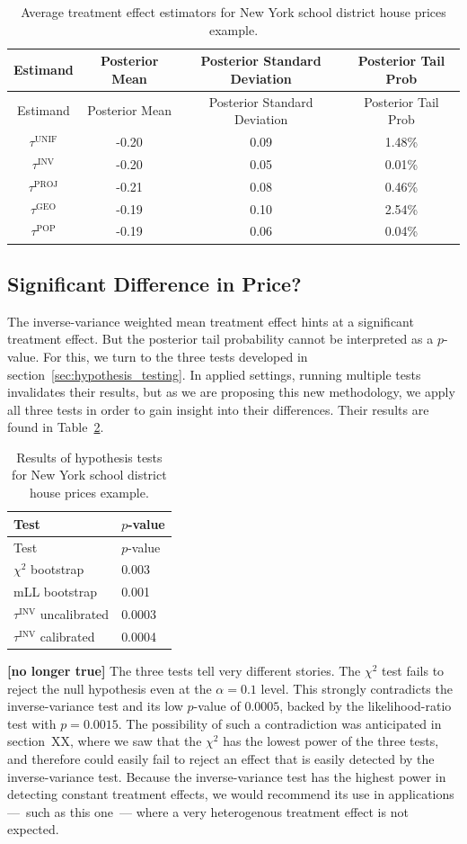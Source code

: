 \documentclass[letter]{article}
\newcommand{\unifavg}{\tau^{\mathrm{UNIF}}}
\newcommand{\invvar}{\tau^{\mathrm{INV}}}
\newcommand{\tauproj}{\tau^{\mathrm{PROJ}}}
\newcommand{\taugeo}{\tau^{\mathrm{GEO}}}
\newcommand{\taupop}{\tau^{\mathrm{POP}}}
\begin{document}
    	\begin{longtable}[]{@{}cccc@{}}
\caption{Average treatment effect estimators for New York school district house prices example. \label{table:NYC_ate}}\tabularnewline
\toprule
Estimand & Posterior Mean & Posterior Standard Deviation & Posterior Tail Prob\tabularnewline
\midrule
\endfirsthead
\toprule
Estimand & Posterior Mean & Posterior Standard Deviation & Posterior Tail Prob\tabularnewline
\midrule
\endhead
\(\unifavg\) & -0.20 & 0.09 & 1.48\%\tabularnewline
\(\invvar\) & -0.20 & 0.05 & 0.01\%\tabularnewline
\(\tauproj\) & -0.21 & 0.08 & 0.46\%\tabularnewline
\(\taugeo\) & -0.19 & 0.10 & 2.54\%\tabularnewline
\(\taupop\) & -0.19 & 0.06 & 0.04\%\tabularnewline
\bottomrule
\end{longtable}
    


    	\subsection{Significant Difference in Price?}\label{significant-difference-in-price}

The inverse-variance weighted mean treatment effect hints at a significant treatment effect.
But the posterior tail probability cannot be interpreted as a \(p\)-value.
For this, we turn to the three tests developed in section~\ref{sec:hypothesis_testing}.
In applied settings, running multiple tests invalidates their results,
but as we are proposing this new methodology,
we apply all three tests in order to gain insight into their differences.
Their results are found in Table~\ref{table:NYC_tests}.
    


    	\begin{longtable}[]{@{}ll@{}}
\caption{Results of hypothesis tests for New York school district house prices example. \label{table:NYC_tests}}\tabularnewline
\toprule
Test & \(p\)-value\tabularnewline
\midrule
\endfirsthead
\toprule
Test & \(p\)-value\tabularnewline
\midrule
\endhead
\(\chi^2\) bootstrap & 0.003\tabularnewline
mLL bootstrap & 0.001\tabularnewline
\(\invvar\) uncalibrated & 0.0003\tabularnewline
\(\invvar\) calibrated & 0.0004\tabularnewline
\bottomrule
\end{longtable}
    


    	\textbf{{[}no longer true{]}}
The three tests tell very different stories.
The \(\chi^2\) test fails to reject the null hypothesis even at the \(\alpha=0.1\) level.
This strongly contradicts the inverse-variance test and its low \(p\)-value of \(0.0005\),
backed by the likelihood-ratio test with \(p=0.0015\).
The possibility of such a contradiction was anticipated in section~XX, where we saw that the \(\chi^2\) has the lowest power of the three tests, and therefore could easily fail to reject an effect that is easily detected by the inverse-variance test.
Because the inverse-variance test has the highest power in detecting constant treatment effects, we would recommend its use in applications ---~such as this one~--- where a very heterogenous treatment effect is not expected.
    
\end{document}
